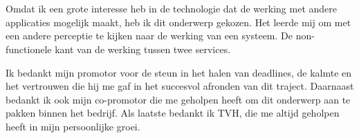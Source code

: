 
\chapter*{}%
\label{ch:voorwoord}


Omdat ik een grote interesse heb in de technologie dat de werking met andere 
applicaties mogelijk maakt, heb ik dit onderwerp gekozen.
Het leerde mij om met een andere perceptie te kijken naar de werking van een systeem. De non-functionele kant van de werking tussen twee services.
\newline

Ik bedankt mijn promotor voor de steun in het halen van deadlines, 
de kalmte en het vertrouwen die hij me gaf in het succesvol afronden van dit traject.
Daarnaast bedankt ik ook mijn co-promotor die me geholpen heeft om dit onderwerp aan te pakken binnen het bedrijf.
Als laatste bedankt ik TVH, die me altijd geholpen heeft in mijn persoonlijke groei.